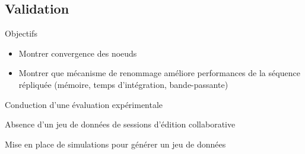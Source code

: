 \subsection{Validation}

\begin{frame}{Objectifs}
  \begin{itemize}
    \item Montrer convergence des noeuds
    \item Montrer que mécanisme de renommage améliore performances de la séquence répliquée (mémoire, temps d'intégration, bande-passante)
  \end{itemize}
  \alert{Conduction d'une évaluation expérimentale}
\end{frame}

\begin{frame}[standout]
  \alert{Absence d'un jeu de données de sessions d'édition collaborative}

  \medskip
  Mise en place de simulations pour générer un jeu de données
\end{frame}

